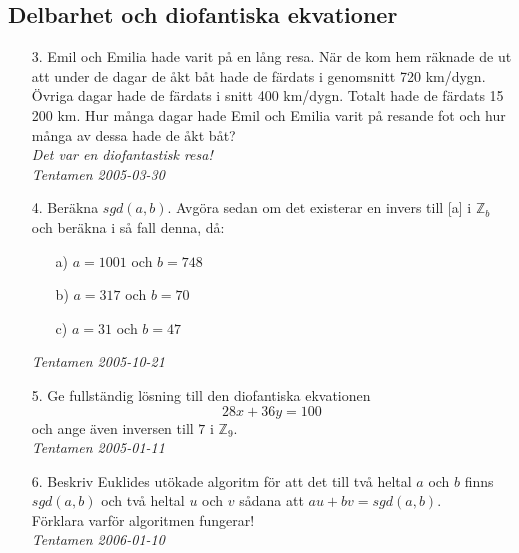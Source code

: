 \documentclass{article}
\begin{document}
\subsection*{Delbarhet och diofantiska ekvationer}
\begin{enumerate}
\item[3.] 
Emil och Emilia hade varit på en lång resa. När de kom hem räknade de ut att under de dagar 
de åkt båt hade de färdats i genomsnitt 720 km/dygn. Övriga dagar hade de färdats i snitt 
400 km/dygn. Totalt hade de färdats 15 200 km. Hur många dagar hade Emil och Emilia varit på 
resande fot och hur många av dessa hade de åkt båt?\\
{\it Det var en diofantastisk resa!}\\

{\it Tentamen 2005-03-30}

\item[4.]
Beräkna $sgd(a,b)$. Avgöra sedan om det existerar en invers till [a] i $\mathbb{Z}_b$ och beräkna 
i så fall denna, då:
\begin{itemize}
\item[a)] $a = 1001$ och $b = 748$
\item[b)] $a = 317$ och $b = 70$
\item[c)] $a = 31$ och $b = 47$ 
\end{itemize}

{\it Tentamen 2005-10-21}

\item[5.]
Ge fullständig lösning till den diofantiska ekvationen $$28x+36y=100$$ och ange även inversen till $7$ i $\mathbb{Z}_9$.\\

{\it Tentamen 2005-01-11}

\item[6. ]
Beskriv Euklides utökade algoritm för att det till två heltal $a$ och $b$ finns 
$sgd(a,b)$ och två heltal $u$ och $v$ sådana att $au+bv=sgd(a,b)$.\\
Förklara varför algoritmen fungerar!\\

{\it Tentamen 2006-01-10}
\end{enumerate}
\end{document}
